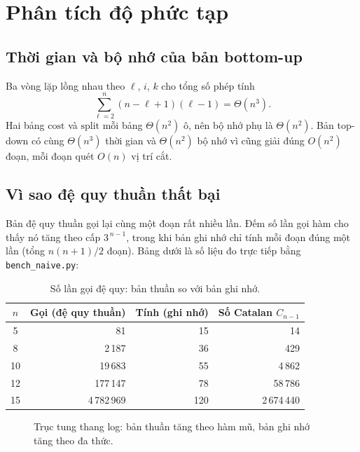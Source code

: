\documentclass[12pt,a4paper]{article}
\begin{document}
\section{Phân tích độ phức tạp}
\label{sec:complexity}

\subsection{Thời gian và bộ nhớ của bản bottom-up}
Ba vòng lặp lồng nhau theo $\ell$, $i$, $k$ cho tổng số phép tính
\[
\sum_{\ell=2}^{n} (n - \ell + 1)(\ell - 1) = \Theta(n^3).
\]
Hai bảng $\mathrm{cost}$ và $\mathrm{split}$ mỗi bảng $\Theta(n^2)$ ô, nên bộ nhớ phụ là $\Theta(n^2)$. Bản top-down có cùng $\Theta(n^3)$ thời gian và $\Theta(n^2)$ bộ nhớ vì cũng giải đúng $O(n^2)$ đoạn, mỗi đoạn quét $O(n)$ vị trí cắt.

\subsection{Vì sao đệ quy thuần thất bại}
Bản đệ quy thuần gọi lại cùng một đoạn rất nhiều lần. Đếm số lần gọi hàm cho thấy nó tăng theo cấp $3^{\,n-1}$, trong khi bản ghi nhớ chỉ tính mỗi đoạn đúng một lần (tổng $n(n+1)/2$ đoạn). Bảng dưới là số liệu đo trực tiếp bằng \texttt{bench\_naive.py}:

\begin{table}[H]
\centering
\caption{Số lần gọi đệ quy: bản thuần so với bản ghi nhớ.}
\small
\begin{tabular}{c r r r}
\toprule
$n$ & Gọi (đệ quy thuần) & Tính (ghi nhớ) & Số Catalan $C_{n-1}$ \\
\midrule
5  & 81 & 15 & 14 \\
8  & 2\,187 & 36 & 429 \\
10 & 19\,683 & 55 & 4\,862 \\
12 & 177\,147 & 78 & 58\,786 \\
15 & 4\,782\,969 & 120 & 2\,674\,440 \\
\bottomrule
\end{tabular}
\end{table}

\begin{figure}[H]
\centering
{}
\caption{Trục tung thang log: bản thuần tăng theo hàm mũ, bản ghi nhớ tăng theo đa thức.}
\end{figure}
\end{document}
